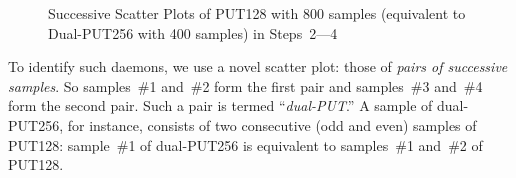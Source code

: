 \documentclass[letter]{ieice}
\begin{document}
\begin{figure}[t]
	\centering
	\vspace{-0.15in}
    \caption{Successive Scatter Plots of PUT128 with 800 samples 
    (equivalent to Dual-PUT256 with 400 samples) in Steps~2---4~\label{fig:put128_plot}} 
    \vspace{-0.3in}     
\end{figure} 

To identify such daemons, we use a novel \hbox{scatter} plot: 
those of {\em pairs of successive samples}. 
So samples~\#{1} and~\#{2} form the first pair and samples~\#{3} and~\#{4} 
form the second pair.
Such a pair is termed ``\hbox{{\it dual-PUT}}.'' 
A sample of \hbox{dual-PUT256}, for instance, 
consists of two consecutive (odd and even) 
samples of PUT128: 
sample~\#{1} of dual-PUT256 is equivalent 
to samples~\#{1} and~\#{2} of PUT128.
\end{document}
